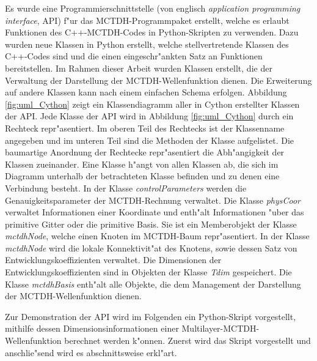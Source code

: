 Es wurde eine Programmierschnittstelle (von englisch \textit{application programming interface}, API) f"ur das MCTDH-Programmpaket erstellt,
welche es erlaubt Funktionen des C++-MCTDH-Codes in Python-Skripten zu verwenden.
Dazu wurden neue Klassen in Python erstellt, welche stellvertretende Klassen des C++-Codes sind 
und die einen eingeschr"ankten Satz an Funktionen bereitstellen.
Im Rahmen dieser Arbeit wurden Klassen erstellt, die der Verwaltung der Darstellung der MCTDH-Wellenfunktion die\-nen.
Die Erweiterung auf andere Klassen kann nach einem einfachen Schema erfolgen.
Abbildung \ref{fig:uml_Cython} zeigt ein Klassendiagramm aller in Cython erstellter Klassen der API.
Jede Klasse der API wird in Abbildung \ref{fig:uml_Cython} durch ein Rechteck repr"asentiert.
Im oberen Teil des Rechtecks ist der Klassenname angegeben und im unteren Teil sind die Methoden der Klasse aufgelistet.
Die baumartige Anordnung der Rechtecke repr"asentiert die Abh"angigkeit der Klassen zueinander. Eine Klasse h"angt von
allen Klassen ab, die sich im Diagramm unterhalb der betrachteten Klasse befinden und zu denen eine Verbindung besteht.
In der Klasse \textit{controlParameters} werden die Genauigkeitspara\-meter der MCTDH-Rechnung verwaltet. 
Die Klasse \textit{physCoor} verwaltet Informationen einer Koordinate und enth"alt Informationen "uber das primitive Gitter oder
die primitive Basis. Sie ist ein Memberobjekt der Klasse \textit{mctdhNode}, welche einen Knoten im MCTDH-Baum 
repr"asentiert. In der Klasse \textit{mctdhNode} wird die lokale Konnektivit"at des Knotens, sowie dessen Satz von
Entwicklungskoeffizienten verwaltet. Die Dimensionen der Entwicklungskoeffizienten sind in Objekten der Klasse
\textit{Tdim} gespeichert. Die Klasse \textit{mctdhBasis} enth"alt alle Objekte, die dem Management der Darstellung der
MCTDH-Wellenfunktion dienen.

Zur Demonstration der API wird im Folgenden ein Python-Skript vorgestellt, mithilfe dessen Dimensionsinformationen
einer Multilayer-MCTDH-Wellenfunktion berechnet werden k"onnen. Zuerst wird das Skript vorgestellt und 
anschlie"send wird es abschnittsweise erkl"art.

